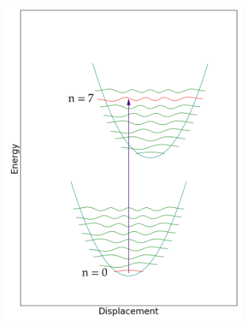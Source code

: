\documentclass[12pt, fleqn]{beamer}
\begin{document}
\begin{frame}
\begin{overlayarea}{\textwidth}{14cm}
{\begin{figure}[h!]
\begin{subfigure}[b]{0.45\linewidth}
                    \includegraphics[width=\linewidth]{fc/tr_7.png}
                \end{subfigure}
                \begin{subfigure}[b]{0.45\linewidth}

\end{subfigure}
\end{figure}}
\end{overlayarea}
\end{frame}
\end{document}
